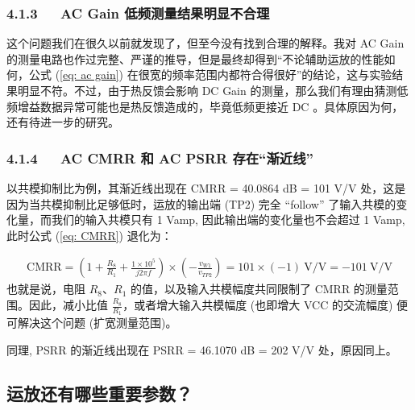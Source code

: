 \documentclass[UTF8]{article}
\begin{document}
\subsubsection*{4.1.3\ \ \ AC Gain 低频测量结果明显不合理}

这个问题我们在很久以前就发现了，但至今没有找到合理的解释。我对 AC Gain 的测量电路也作过完整、严谨的推导，但是最终却得到“不论辅助运放的性能如何，公式 (\ref{eq: ac gain}) 在很宽的频率范围内都符合得很好”的结论，这与实验结果明显不符。不过，由于热反馈会影响 DC Gain 的测量，那么我们有理由猜测低频增益数据异常可能也是热反馈造成的，毕竟低频更接近 DC 。具体原因为何，还有待进一步的研究。

\subsubsection*{4.1.4\ \ \ AC CMRR 和 AC PSRR 存在“渐近线”}

以共模抑制比为例，其渐近线出现在 CMRR = 40.0864 dB = 101 V/V 处，这是因为当共模抑制比足够低时，运放的输出端 (TP2) 完全 ``follow'' 了输入共模的变化量，而我们的输入共模只有 1 Vamp, 因此输出端的变化量也不会超过 1 Vamp, 此时公式 (\ref{eq: CMRR}) 退化为：

\begin{gather}
\mathrm{CMRR} = \left(1 + \frac{R_8}{R_1} + \frac{1\times 10^5}{j 2\pi f}\right)\times \left(-\frac{v_{W1}}{v_{TP2}}\right) = 101 \times (-1) \ \mathrm{V/V} = -101 \ \mathrm{V/V} 
\end{gather}
也就是说，电阻 $R_8$、$R_1$ 的值，以及输入共模幅度共同限制了 CMRR 的测量范围。因此，减小比值 $\frac{R_8}{R_1}$，或者增大输入共模幅度 (也即增大 VCC 的交流幅度) 便可解决这个问题 (扩宽测量范围)。

同理, PSRR 的渐近线出现在 PSRR = 46.1070 dB = 202 V/V 处，原因同上。


\subsection{运放还有哪些重要参数？}
\end{document}
